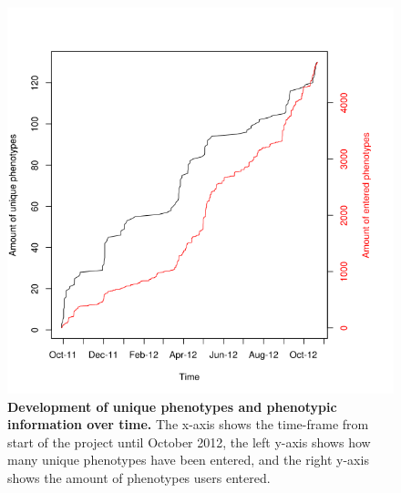 \documentclass[10pt]{article}
\begin{document}
\begin{figure}[!ht]
	\begin{center}
		\includegraphics[scale=0.40]{25_10_2012_Graphs/phenotypes_vs_userphenotypes.tif}
	\end{center}
	\caption{
	{\bf Development of unique phenotypes and phenotypic information over time.} The x-axis shows the time-frame from start of the project until October 2012, the left y-axis shows how many unique phenotypes have been entered, and the right y-axis shows the amount of phenotypes users entered.}
	\label{pheno}
\end{figure}
\end{document}
